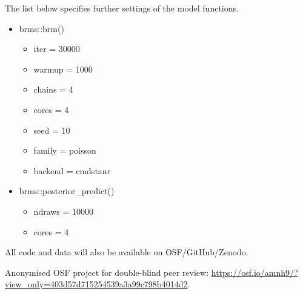 \documentclass[unnumsec,webpdf,modern,medium]{oup-authoring-template}
\begin{document}
\begin{appendices}
The list below specifies further settings of the model functions.

\begin{itemize}
    \item brms::brm()
    \begin{itemize}
    \item  iter = 30000
    \item  warmup = 1000
    \item  chains = 4
    \item  cores = 4
    \item  seed = 10
    \item family = poisson
    \item backend = cmdstanr
    \end{itemize}
    \item brms::posterior\_predict()
    \begin{itemize}
    \item  ndraws = 10000
    \item  cores = 4
    \end{itemize}
\end{itemize}

All code and data will also be available on OSF/GitHub/Zenodo.

Anonymised OSF project for double-blind peer review: \url{https://osf.io/amnh9/?view_only=403d57d715254539a3a99c798b4014d2}.









\end{appendices}
\end{document}
